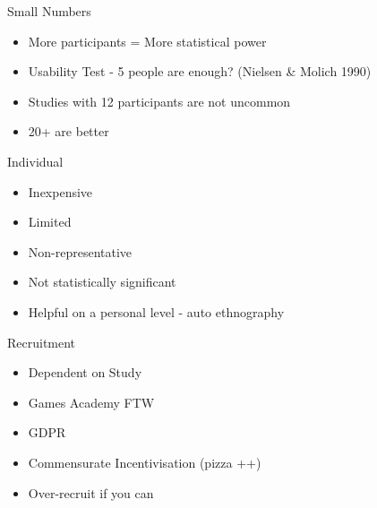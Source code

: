 \documentclass[ignorenonframetext,]{beamer}
\providecommand{\tightlist}{%
  \setlength{\itemsep}{0pt}\setlength{\parskip}{0pt}}
\begin{document}
\begin{frame}{Small Numbers}

\begin{itemize}
\tightlist
\item
  More participants = More statistical power
\item
  Usability Test - 5 people are enough? (Nielsen \& Molich 1990)
\item
  Studies with 12 participants are not uncommon
\item
  20+ are better
\end{itemize}

\end{frame}

\begin{frame}{Individual}

\begin{itemize}
\tightlist
\item
  Inexpensive
\item
  Limited
\item
  Non-representative
\item
  Not statistically significant
\item
  Helpful on a personal level - auto ethnography
\end{itemize}

\end{frame}

\begin{frame}{Recruitment}

\begin{itemize}
\tightlist
\item
  Dependent on Study
\item
  Games Academy FTW
\item
  GDPR
\item
  Commensurate Incentivisation (pizza ++)
\item
  Over-recruit if you can
\end{itemize}

\end{frame}
\end{document}
